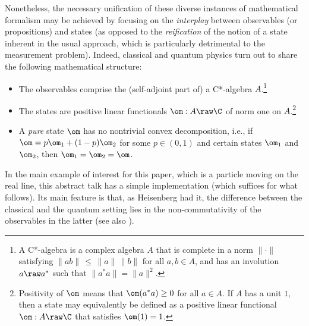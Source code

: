 \documentclass[12pt]{article}
\newcommand{\mmp}{measurement problem}
\begin{document}
Nonetheless, the necessary unification of these diverse instances of mathematical formalism may be achieved by focusing on the \emph{interplay} between observables (or propositions) and states (as opposed to the \emph{reification} of the notion of a state inherent in the usual approach, which is particularly detrimental to the  \mmp). Indeed, classical and quantum physics turn out to share the following mathematical structure:
\begin{itemize}
\item The observables comprise the (self-adjoint part of) a C*-algebra $A$.\footnote{A C*-algebra is a complex algebra $A$ that is complete in a norm $\|\cdot\|$ satisfying $\| ab\|\,\leq\, \| a\|\,\|
b\|$ for all $a,b\in A$, and has an involution $a\raw a^*$ such that $\| a^*a\|=\| a\|^2$.}
\item  The states are positive linear functionals  $\om:A\raw\C$  of norm one on $A$.\footnote{Positivity of  $\om$ means that $\om(a^*a)\geq 0$ for all $a\in A$.
 If $A$ has a unit $1$, then a state may equivalently be defined as a  positive linear functional $\om:A\raw\C$ that satisfies $\om(1)=1$.} 
 \item A \emph{pure} state $\om$ has no nontrivial convex decomposition, i.e., if $\om=p\om_1+(1-p)\om_2$ for some $p\in (0,1)$ and certain states $\om_1$ and $\om_2$, then $\om_1=\om_2=\om$.
\end{itemize}
In the main example of interest for this paper, which is a particle moving on the real line, this abstract talk has a  simple implementation (which suffices  for what follows). Its main feature is that, as Heisenberg had it, the difference between the classical and the quantum setting  lies in the non-commutativity of the observables in the latter (see also \cite{CBH}).
\end{document}
